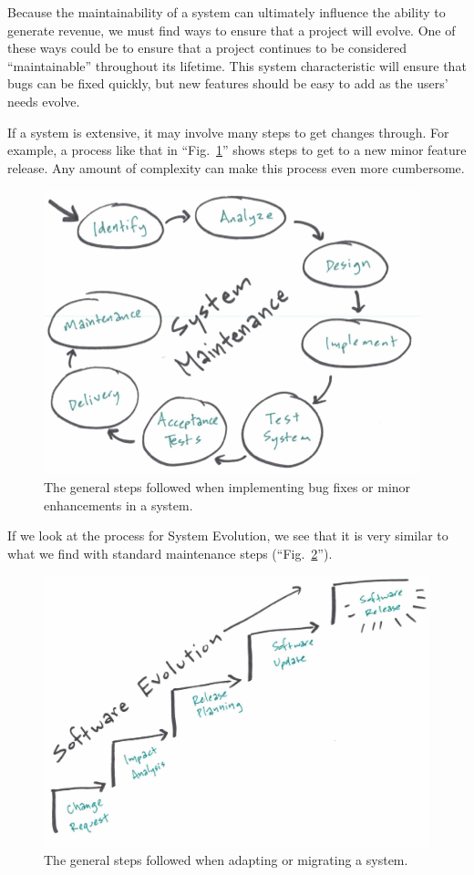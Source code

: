 \documentclass[12pt,conference]{IEEEtran}
\begin{document}

Because the maintainability of a system can ultimately influence the ability to generate revenue, we must find ways to ensure that a project will evolve. One of these ways could be to ensure that a project continues to be considered ``maintainable'' throughout its lifetime. This system characteristic will ensure that bugs can be fixed quickly, but new features should be easy to add as the users' needs evolve.

If a system is extensive, it may involve many steps to get changes through. For example, a process like that in ``Fig.~\ref{figSystemMaintenance}'' shows steps to get to a new minor feature release. Any amount of complexity can make this process even more cumbersome.

\begin{figure}[ht]
    \centerline{
        \includegraphics[width=0.8\columnwidth]{Maintenance}
    }
    \caption{The general steps followed when implementing bug fixes or minor enhancements in a system.}
    \label{figSystemMaintenance}
\end{figure}

If we look at the process for System Evolution, we see that it is very similar to what we find with standard maintenance steps (``Fig.~\ref{figSystemEvolution}'').

\begin{figure}[ht]
    \centerline{
        \includegraphics[width=0.8\columnwidth]{Evolution}
    }
    \caption{The general steps followed when adapting or migrating a system.}
    \label{figSystemEvolution}
\end{figure}
\end{document}
